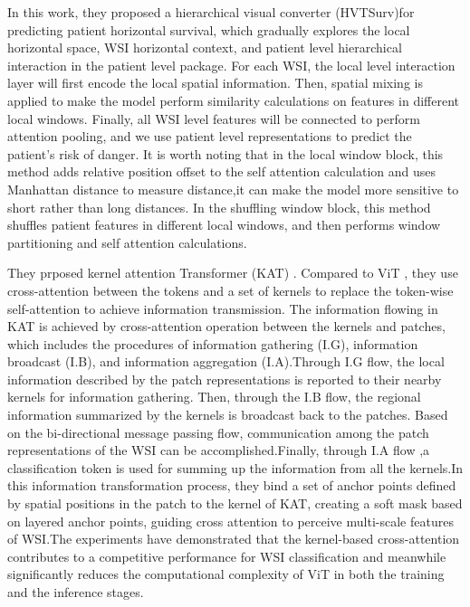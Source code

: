 \documentclass[journal,twoside,web]{ieeecolor}
\begin{document}
In this work, they proposed a hierarchical visual converter (HVTSurv)\cite{shao2023hvtsurv}for predicting patient horizontal survival, which gradually explores the local horizontal space, WSI horizontal context, and patient level hierarchical interaction in the patient level package. For each WSI, the local level interaction layer will first encode the local spatial information. Then, spatial mixing is applied to make the model perform similarity calculations on features in different local windows. Finally, all WSI level features will be connected to perform attention pooling, and we use patient level representations to predict the patient's risk of danger. It is worth noting that in the local window block, this method adds relative position offset to the self attention calculation and uses Manhattan distance to measure distance,it can make the model more sensitive to short rather than long distances\cite{wu2021rethinking}. In the shuffling window block, this method shuffles patient features in different local windows, and then performs window partitioning and self attention calculations.

They prposed kernel attention Transformer (KAT)\cite{zheng2023kernel} . Compared to ViT \cite{dosovitskiy2020image}, they use cross-attention between the tokens and a set of kernels to replace the token-wise self-attention to achieve information transmission. The information flowing in KAT is achieved by cross-attention operation between the kernels and patches, which includes the procedures of information gathering (I.G), information broadcast (I.B), and information aggregation (I.A).Through I.G flow, the local information described by the patch representations is reported to their nearby kernels for information gathering. Then, through the I.B flow, the regional information summarized by the kernels is broadcast back to the patches. Based on the bi-directional message passing flow, communication among the patch representations of the WSI can be accomplished.Finally, through I.A flow ,a classification token is used for summing up the information from all the kernels.In this information transformation process, they bind a set of anchor points defined by spatial positions in the patch to the kernel of KAT, creating a soft mask based on layered anchor points, guiding cross attention to perceive multi-scale features of WSI.The experiments have demonstrated that the kernel-based cross-attention contributes to a competitive performance for WSI classification and meanwhile significantly reduces the computational complexity of ViT in both the training and the inference stages.
\end{document}
